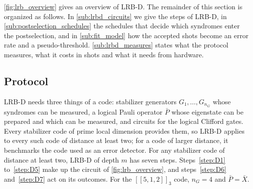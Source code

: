 \autoref{fig:lrb_overview} gives an overview of LRB-D. The remainder of this section is organized as follows. In \autoref{sub:lrbd_circuits} we give the steps of LRB-D, in \autoref{sub:postselection_schedules} the schedules that decide which syndromes enter the postselection, and in \autoref{sub:fit_model} how the accepted shots become an error rate and a pseudo-threshold. \autoref{sub:lrbd_measures} states what the protocol measures, what it costs in shots and what it needs from hardware.

\subsection{Protocol}
\label{sub:lrbd_circuits}

LRB-D needs three things of a code: stabilizer generators $G_1, \dots, G_{n_G}$ whose syndromes can be measured, a logical Pauli operator $\bar P$ whose eigenstate can be prepared and which can be measured, and circuits for the logical Clifford gates. Every stabilizer code of prime local dimension provides them, so LRB-D applies to every such code of distance at least two; for a code of larger distance, it benchmarks the code used as an error detector. For any stabilizer code of distance at least two, LRB-D of depth $m$ has seven steps. Steps~\ref{step:D1} to~\ref{step:D5} make up the circuit of \autoref{fig:lrb_overview}, and steps~\ref{step:D6} and~\ref{step:D7} act on its outcomes. For the $[[5,1,2]]_3$ code, $n_G = 4$ and $\bar P = \bar X$.

